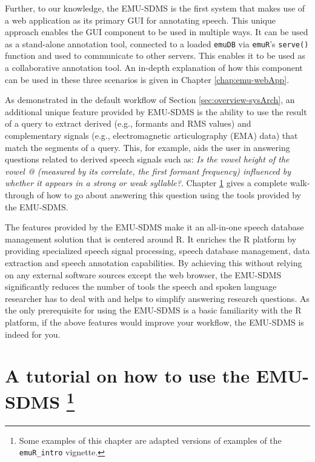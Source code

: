 \documentclass[]{book}
\let\rmarkdownfootnote\footnote%
\def\footnote{\protect\rmarkdownfootnote}
\theoremstyle{definition}
\theoremstyle{definition}
\theoremstyle{definition}
\theoremstyle{remark}
\begin{document}
Further, to our knowledge, the EMU-SDMS is the first system that makes
use of a web application as its primary GUI for annotating speech. This
unique approach enables the GUI component to be used in multiple ways.
It can be used as a stand-alone annotation tool, connected to a loaded
\texttt{emuDB} via \texttt{emuR}'s \texttt{serve()} function and used to
communicate to other servers. This enables it to be used as a
collaborative annotation tool. An in-depth explanation of how this
component can be used in these three scenarios is given in Chapter
\ref{chap:emu-webApp}.

As demonstrated in the default workflow of Section
\ref{sec:overview-sysArch}, an additional unique feature provided by
EMU-SDMS is the ability to use the result of a query to extract derived
(e.g., formants and RMS values) and complementary signals (e.g.,
electromagnetic articulography (EMA) data) that match the segments of a
query. This, for example, aids the user in answering questions related
to derived speech signals such as: \emph{Is the vowel height of the
vowel @ (measured by its correlate, the first formant frequency)
influenced by whether it appears in a strong or weak syllable?}. Chapter
\ref{chap:tutorial} gives a complete walk-through of how to go about
answering this question using the tools provided by the EMU-SDMS.

The features provided by the EMU-SDMS make it an all-in-one speech
database management solution that is centered around R. It enriches the
R platform by providing specialized speech signal processing, speech
database management, data extraction and speech annotation capabilities.
By achieving this without relying on any external software sources
except the web browser, the EMU-SDMS significantly reduces the number of
tools the speech and spoken language researcher has to deal with and
helps to simplify answering research questions. As the only prerequisite
for using the EMU-SDMS is a basic familiarity with the R platform, if
the above features would improve your workflow, the EMU-SDMS is indeed
for you.

\hypertarget{chap:tutorial}{%
\chapter[A tutorial on how to use the EMU-SDMS ]{\texorpdfstring{A
tutorial on how to use the EMU-SDMS \footnote{Some examples of this
  chapter are adapted versions of examples of the \texttt{emuR\_intro}
  vignette.}}{A tutorial on how to use the EMU-SDMS }}\label{chap:tutorial}}
\end{document}
